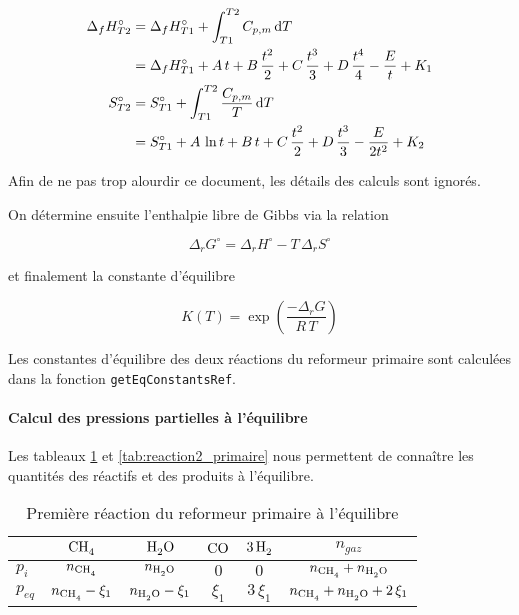 \begin{align*}
	\Delta_f H_{T2}^{\circ} &= \Delta_f H_{T1}^{\circ} 
	+ \int_{T1}^{T2} C_{p,m} \, \mathrm{d}T \\ 
				 &= \Delta_f H_{T1}^{\circ} 
	+ A \, t + B \, \frac{t^2}{2}  + C \,  \frac{t^3}{3} 
	+ D \, \frac{t^4}{4} - \frac{E}{t} + K_{1} \\		 
	S_{T2}^{\circ}  &= S_{T1}^{\circ} + \int_{T1}^{T2} 
	\frac{C_{p,m}}{T} \, \mathrm{d}T \\
			&= S_{T1}^{\circ} + A \, \ln{t} 
	+ B \, t + C \, \frac{t^2}{2} 
	+ D \, \frac{t^3}{3} - \frac{E}{2 t^{2}} + K_{2} 
\end{align*}

Afin de ne pas trop alourdir ce document, les détails des calculs sont ignorés. 

On détermine ensuite l'enthalpie libre de Gibbs via la relation 

\begin{equation*}
	\Delta_r G^{\circ} = \Delta_r H^{\circ} 
	- T \, \Delta_r S^{\circ}
\end{equation*}

et finalement la constante d'équilibre 

\[ 
K(T) = \exp{\left(\frac{- \Delta_r G}{R \, T}\right)} 
\]

Les constantes d'équilibre des deux réactions du reformeur primaire 
sont calculées dans la fonction \texttt{getEqConstantsRef}.

\paragraph{Calcul des pressions partielles à l'équilibre}

Les tableaux \ref{tab:reaction1_primaire} et \ref{tab:reaction2_primaire} nous 
permettent de conna\^itre les quantités des réactifs et des produits à l'équilibre. 

\begin{table}
	\centering
	\begin{tabular}{l|c|c|c|c|c}
		 & $\ce{CH4}$ & $\ce{H2O}$ & $\ce{CO}$ & $\ce{3H2}$ & $n_{gaz}$ \\
		\hline
		$p_{i}$ & $n_{\ce{CH4}}$ & $n_{\ce{H2O}}$ & $0$ & $0$ &
		$n_{\ce{CH4}} + n_{\ce{H2O}}$ \\
		$p_{eq}$ & $n_{\ce{CH4}} - \xi_1$ & $n_{\ce{H2O}} - \xi_1$ & 
		$\xi_1$ & $3 \, \xi_1$ & $n_{\ce{CH4}} + n_{\ce{H2O}} + 2 \, \xi_1 $\\
	\end{tabular}
	\caption{Première réaction du reformeur primaire à l'équilibre}
	\label{tab:reaction1_primaire}
\end{table}

